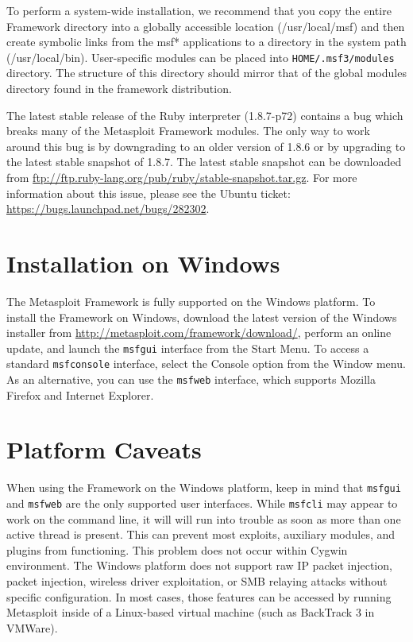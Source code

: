 \documentclass{report}
\begin{document}
\par
To perform a system-wide installation, we recommend that you copy the entire
Framework directory into a globally accessible location (/usr/local/msf) and
then create symbolic links from the msf* applications to a directory in the
system path (/usr/local/bin). User-specific modules can be placed into
\texttt{HOME/.msf3/modules} directory.  The structure of this directory should
mirror that of the global modules directory found in the framework
distribution.

\par
The latest stable release of the Ruby interpreter (1.8.7-p72) contains a bug which
breaks many of the Metasploit Framework modules. The only way to work around this 
bug is by downgrading to an older version of 1.8.6 or by upgrading to the latest
stable snapshot of 1.8.7. The latest stable snapshot can be downloaded from 
\url{ftp://ftp.ruby-lang.org/pub/ruby/stable-snapshot.tar.gz}. For more information
about this issue, please see the Ubuntu ticket: \url{https://bugs.launchpad.net/bugs/282302}.



    \section{Installation on Windows}
    \label{INSTALL-WIN32}

\par
The Metasploit Framework is fully supported on the Windows platform. To install the Framework on Windows, 
download the latest version of the Windows installer from \url{http://metasploit.com/framework/download/}, perform 
an online update, and launch the \texttt{msfgui} interface from the Start Menu. To access a standard
\texttt{msfconsole} interface, select the Console option from the Window menu. As an alternative, you can
use the \texttt{msfweb} interface, which supports Mozilla Firefox and Internet Explorer.


    \section{Platform Caveats}
    \label{INSTALL-CAVEAT}

\par
When using the Framework on the Windows platform, keep in mind that \texttt{msfgui} and \texttt{msfweb} are the only
supported user interfaces. While \texttt{msfcli} may appear to work on the command line, it will will run into
trouble as soon as more than one active thread is present. This can prevent most exploits, auxiliary modules,
and plugins from functioning. This problem does not occur within Cygwin environment. The Windows platform does
not support raw IP packet injection, packet injection, wireless driver exploitation, or SMB relaying attacks
without specific configuration. In most cases, those features can be accessed by running Metasploit inside of a 
Linux-based virtual machine (such as BackTrack 3 in VMWare).
\end{document}
